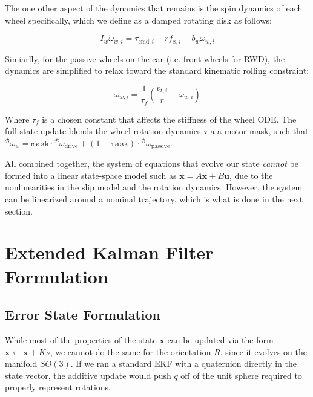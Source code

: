 The one other aspect of the dynamics that remains is the spin dynamics of each wheel specifically, which we define as a damped rotating disk as follows:

\begin{equation}
  I_w \dot{\omega}_{w,i} = \tau_{\mathrm{cmd},i} - r f_{x,i} - b_w \omega_{w,i} \label{eq:back_wheels}
\end{equation}

Simiarlly, for the passive wheels on the car (i.e. front wheels for RWD), the dynamics are simplified to relax toward the standard kinematic rolling constraint:

\begin{equation}
  \dot{\omega}_{w,i} = \frac{1}{\tau_f}\left(\frac{v_{t,i}}{r}-\omega_{w,i}\right) \label{eq:front_wheels}
\end{equation}

Where $\tau_f$ is a chosen constant that affects the stiffness of the wheel ODE. The full state update blends the wheel rotation dynamics via a motor mask, such that ${}^\mathcal{B}\dot{\omega}_w = \texttt{mask} \cdot {}^\mathcal{B}\dot{\omega}_\mathrm{drive} + (1- \texttt{mask}) \cdot {}^\mathcal{B}\dot{\omega}_\mathrm{passive}$.

All combined together, the system of equations that evolve our state \textit{cannot} be formed into a linear state-space model such as $\dot{\mathbf{x}}=A\mathbf{x} + B\mathbf{u}$, due to the nonlinearities in the slip model and the rotation dynamics. However, the system can be linearized around a nominal trajectory, which is what is done in the next section.


\section{Extended Kalman Filter Formulation}

\subsection{Error State Formulation}
While most of the properties of the state $\mathbf{x}$ can be updated via the form $\mathbf{x} \leftarrow \mathbf{x} + K \nu$, we cannot do the same for the orientation $R$, since it evolves on the manifold $SO(3)$. If we ran a standard EKF with a quaternion directly in the state vector, the additive update would push $q$ off of the unit sphere required to properly represent rotations.

